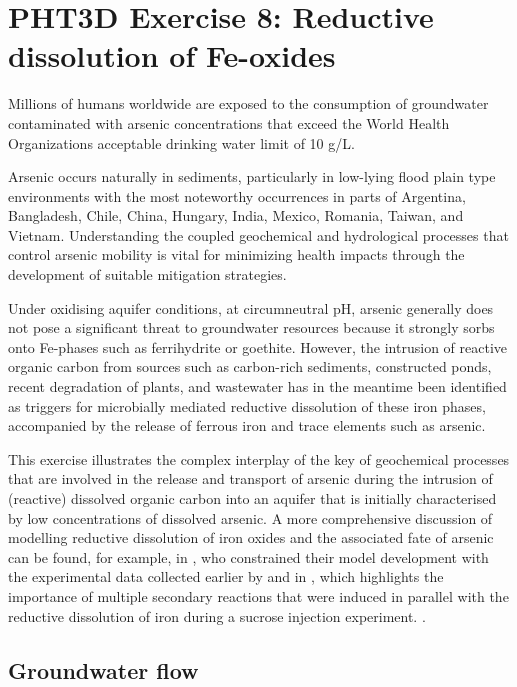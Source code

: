 \section[PHT3D Exercise 8: Reductive dissolution of Fe-oxides]{PHT3D Exercise 8: Reductive dissolution of Fe-oxides}

Millions of humans worldwide are exposed to the consumption
of groundwater contaminated with arsenic concentrations that
exceed the World Health Organizations acceptable drinking
water limit of 10 \micro g/L. 

Arsenic occurs naturally in sediments, particularly in low-lying flood plain type environments with the most noteworthy occurrences in parts of Argentina, Bangladesh, Chile, China, Hungary, India, Mexico, Romania, Taiwan, and Vietnam. Understanding the coupled geochemical and hydrological processes that control arsenic mobility is vital for minimizing health impacts through the development of suitable mitigation strategies. 

Under oxidising aquifer conditions, at circumneutral pH, arsenic generally does not pose
a significant threat to groundwater resources because it strongly
sorbs onto Fe-phases such as ferrihydrite or goethite. 
However, the intrusion of reactive organic carbon from sources such as
carbon-rich sediments, constructed ponds, recent degradation
of plants, and wastewater has in the meantime been
identified as triggers for microbially mediated reductive
dissolution of these iron phases, accompanied by the release
of ferrous iron and trace elements such as arsenic.

This exercise illustrates the complex interplay of the key of geochemical processes that are involved in the
release and transport of arsenic during the intrusion of (reactive) dissolved organic carbon into an aquifer that is initially characterised by low concentrations of dissolved arsenic. A more comprehensive discussion of modelling reductive dissolution of iron oxides and the associated fate of arsenic can be found, for example, in \cite{Rawson20162459}, who constrained their model development with the experimental data collected earlier by \cite{Tufano20084777} and in \cite{rawson2017}, which highlights the importance of multiple secondary reactions that were induced in parallel with the reductive dissolution of iron during a sucrose injection experiment.   
.    

\subsection[Groundwater flow]{Groundwater flow}

